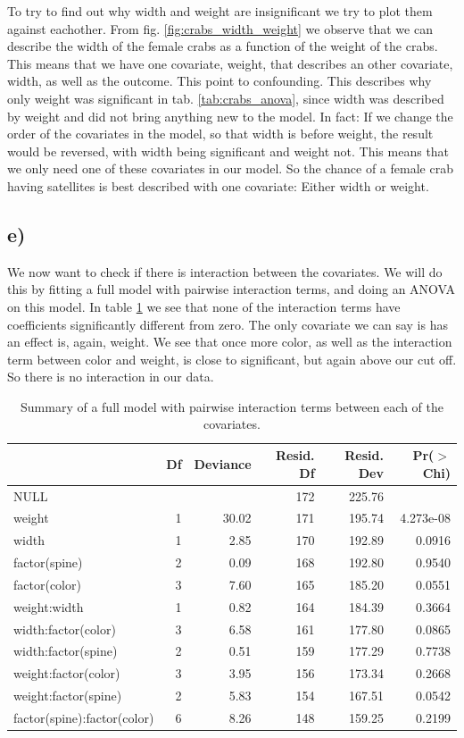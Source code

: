 \documentclass[a4paper,norsk, 10pt]{article}
\begin{document}
To try to find out why width and weight are insignificant we try to plot them against eachother. From fig. \ref{fig:crabs_width_weight} we observe that we can describe the width of the female crabs as a function of the weight of the crabs. This means that we have one covariate, weight, that describes an other covariate, width, as well as the outcome. This point to confounding. This describes why only weight was significant in tab. \ref{tab:crabs_anova}, since width was described by weight and did not bring anything new to the model. In fact: If we change the order of the covariates in the model, so that width is before weight, the result would be reversed, with width being significant and weight not. This means that we only need one of these covariates in our model. So the chance of a female crab having satellites is best described with one covariate: Either width or weight.

\subsection{e)}
We now want to check if there is interaction between the covariates. We will do this by fitting a full model with pairwise interaction terms, and doing an ANOVA on this model. In table \ref{tab:crabs_interaction} we see that none of the interaction terms have coefficients significantly different from zero. The only covariate we can say is has an effect is, again, weight. We see that once more color, as well as the interaction term between color and weight, is close to significant, but again above our cut off. So there is no interaction in our data. 	

\begin{table}[ht]
\centering
\begin{tabular}{lrrrrr}
  \hline
 & Df & Deviance & Resid. Df & Resid. Dev & Pr($>$Chi) \\ 
  \hline
NULL &  &  & 172 & 225.76 &  \\ 
  weight & 1 & 30.02 & 171 & 195.74 & 4.273e-08 \\ 
  width & 1 & 2.85 & 170 & 192.89 & 0.0916 \\ 
  factor(spine) & 2 & 0.09 & 168 & 192.80 & 0.9540 \\ 
  factor(color) & 3 & 7.60 & 165 & 185.20 & 0.0551 \\ 
  weight:width & 1 & 0.82 & 164 & 184.39 & 0.3664 \\ 
  width:factor(color) & 3 & 6.58 & 161 & 177.80 & 0.0865 \\ 
  width:factor(spine) & 2 & 0.51 & 159 & 177.29 & 0.7738 \\ 
  weight:factor(color) & 3 & 3.95 & 156 & 173.34 & 0.2668 \\ 
  weight:factor(spine) & 2 & 5.83 & 154 & 167.51 & 0.0542 \\ 
  factor(spine):factor(color) & 6 & 8.26 & 148 & 159.25 & 0.2199 \\ 
   \hline
\end{tabular}
\caption{Summary of a full model with pairwise interaction terms between each of the covariates.}\label{tab:crabs_interaction}
\end{table}
\end{document}
